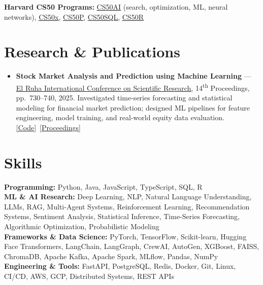 \documentclass[a4paper,10pt]{article}
\newcommand{\ulink}[2]{\href{#1}{\uline{#2}}}
\begin{document}
\vspace{4pt}

{\color[HTML]{3A3A3A}\fontsize{11}{15}\selectfont \textbf{Harvard CS50 Programs:} \ulink{https://cs50.harvard.edu/certificates/9cdb4d4a-1250-4f8e-9fd7-191864e0f919}{CS50AI} (search, optimization, ML, neural networks), \ulink{https://cs50.harvard.edu/certificates/b14b78df-e05c-413e-a607-1dd27303053a}{CS50x}, \ulink{https://cs50.harvard.edu/certificates/32477052-9db4-49c4-a5a4-d7e58429ca2c}{CS50P}, \ulink{https://cs50.harvard.edu/certificates/bc486f24-f085-4e61-8536-80940b97a1b9}{CS50SQL}, \ulink{https://cs50.harvard.edu/certificates/666838e6-a053-4d82-b179-a60fe745fd84}{CS50R}}

\vspace{3pt}

\section{Research \& Publications}
\vspace{3pt}

\begin{itemize}[nosep, leftmargin=1.5em, itemsep=2pt, topsep=2pt]
  \item {\color[HTML]{0A0A0A}\fontsize{11}{15}\selectfont
    \textbf{Stock Market Analysis and Prediction using Machine Learning} ---
    \ulink{https://www.elruha.org/_files/ugd/614b1f_6b95e1b697bf452b9907ba46e0151c05.pdf\#page=774}{El Ruha International Conference on Scientific Research}, 14\textsuperscript{th} Proceedings, pp.\ 730--740, 2025.
    Investigated time-series forecasting and statistical modeling for financial market prediction; designed ML pipelines for feature engineering, model training, and real-world equity data evaluation.
    \ulink{https://github.com/su-jin1425/Set-Project}{[Code]}\ \ulink{https://www.elruha.org/congress-books}{[Proceedings]}
  }
\end{itemize}

\vspace{3pt}

\section{Skills}
\vspace{3pt}
{\color[HTML]{0A0A0A}\fontsize{11}{15}\selectfont
\textbf{Programming:} Python, Java, JavaScript, TypeScript, SQL, R \\[3pt]
\textbf{ML \& AI Research:} Deep Learning, NLP, Natural Language Understanding, LLMs, RAG, Multi-Agent Systems, Reinforcement Learning, Recommendation Systems, Sentiment Analysis, Statistical Inference, Time-Series Forecasting, Algorithmic Optimization, Probabilistic Modeling \\[3pt]
\textbf{Frameworks \& Data Science:} PyTorch, TensorFlow, Scikit-learn, Hugging Face Transformers, LangChain, LangGraph, CrewAI, AutoGen, XGBoost, FAISS, ChromaDB, Apache Kafka, Apache Spark, MLflow, Pandas, NumPy \\[3pt]
\textbf{Engineering \& Tools:} FastAPI, PostgreSQL, Redis, Docker, Git, Linux, CI/CD, AWS, GCP, Distributed Systems, REST APIs
}
\end{document}
